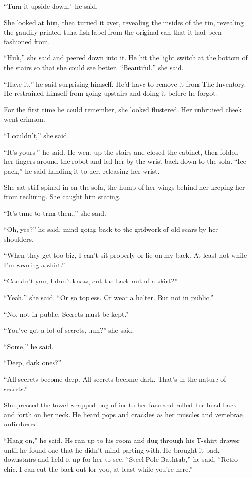``Turn it upside down,'' he said.

She looked at him, then turned it over, revealing the insides of the
tin, revealing the gaudily printed tuna-fish label from the original
can that it had been fashioned from.

``Huh,'' she said and peered down into it.  He hit the light switch at
the bottom of the stairs so that she could see better.  ``Beautiful,''
she said.

``Have it,'' he said surprising himself.  He'd have to remove it from
The Inventory.  He restrained himself from going upstairs and doing it
before he forgot.

For the first time he could remember, she looked flustered.  Her
unbruised cheek went crimson.

``I couldn't,'' she said.

``It's yours,'' he said.  He went up the stairs and closed the
cabinet, then folded her fingers around the robot and led her by the
wrist back down to the sofa.  ``Ice pack,'' he said handing it to her,
releasing her wrist.

She sat stiff-spined in on the sofa, the hump of her wings behind her
keeping her from reclining.  She caught him staring.

``It's time to trim them,'' she said.

``Oh, yes?'' he said, mind going back to the gridwork of old scars by
her shoulders.

``When they get too big, I can't sit properly or lie on my back.  At
least not while I'm wearing a shirt.''

``Couldn't you, I don't know, cut the back out of a shirt?''

``Yeah,'' she said.  ``Or go topless.  Or wear a halter.  But not in
public.''

``No, not in public.  Secrets must be kept.''

``You've got a lot of secrets, huh?'' she said.

``Some,'' he said.

``Deep, dark ones?''

``All secrets become deep.  All secrets become dark.  That's in the
nature of secrets.''

She pressed the towel-wrapped bag of ice to her face and rolled her
head back and forth on her neck.  He heard pops and crackles as her
muscles and vertebrae unlimbered.

``Hang on,'' he said.  He ran up to his room and dug through his
T-shirt drawer until he found one that he didn't mind parting with. 
He brought it back downstairs and held it up for her to see.  ``Steel
Pole Bathtub,'' he said.  ``Retro chic.  I can cut the back out for
you, at least while you're here.''

